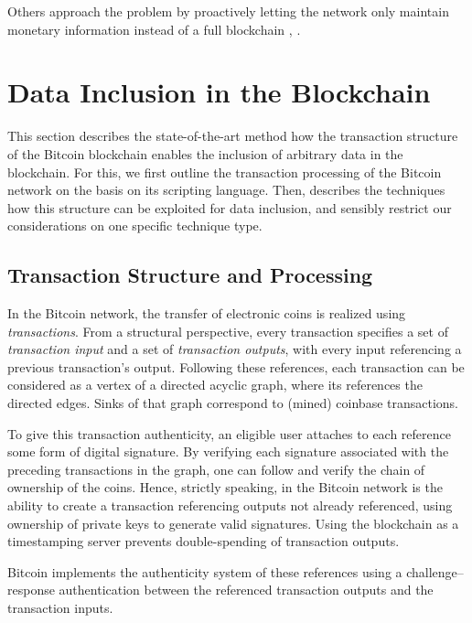\documentclass[a4paper,11pt,titlepage]{scrbook}
\begin{document}
Others approach the problem by proactively letting the network only maintain monetary information instead of a full blockchain \cite{chepurnoy_rollerchain_2016}, \cite{bruce_miniblockchain_2017}.


\chapter{Data Inclusion in the Blockchain}\label{chap:problem}

This section describes the state-of-the-art method how the transaction structure of the Bitcoin blockchain enables the inclusion of arbitrary data in the blockchain.
For this, we first outline the transaction processing of the Bitcoin network on the basis on its scripting language. Then, describes the techniques how this structure can be exploited for data inclusion, and sensibly restrict our considerations on one specific technique type.


\section{Transaction Structure and Processing}

In the Bitcoin network, the transfer of electronic coins is realized using \emph{transactions}.
From a structural perspective, every transaction specifies a set of \emph{transaction input} and a set of \emph{transaction outputs}, with every input referencing a previous transaction's output.
Following these references, each transaction can be considered as a vertex of a directed acyclic graph, where  its references the directed edges. Sinks of that graph correspond to (mined) coinbase transactions.

To give this transaction authenticity, an eligible user attaches to each reference some form of digital signature.
By verifying each signature associated with the preceding transactions in the graph, one can follow and verify the chain of ownership of the coins.
Hence, strictly speaking,  in the Bitcoin network is the ability to create a transaction referencing outputs not already referenced, using ownership of private keys to generate valid signatures.
Using the blockchain as a timestamping server prevents double-spending of transaction outputs.

Bitcoin implements the authenticity system of these references using a challenge–response authentication between the referenced transaction outputs and the transaction inputs.
\end{document}
